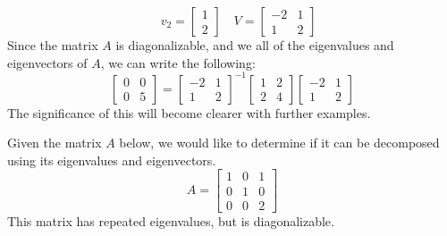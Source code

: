 \begin{example}
\begin{equation*}
  \quad
  v_{2}=
  \left[
    \begin{array}{c}
      1 \\ 2
    \end{array}
  \right]
  \quad
  V=
  \left[
    \begin{array}{cc}
      -2 & 1 \\ 1 & 2
    \end{array}
  \right]
\end{equation*}
Since the matrix $A$ is diagonalizable, and we all of the eigenvalues and eigenvectors of $A$, we can write the following:
\begin{equation*}
  \left[
    \begin{array}{cc}
    0 & 0 \\ 0 & 5
    \end{array}
  \right]
  =
  \left[
    \begin{array}{cc}
    -2 & 1 \\ 1 & 2
    \end{array}
  \right]^{-1}
  \left[
    \begin{array}{cc}
    1 & 2 \\ 2 & 4
    \end{array}
  \right]
  \left[
    \begin{array}{cc}
    -2 & 1 \\ 1 & 2
    \end{array}
  \right]
\end{equation*}
The significance of this will become clearer with further examples.
\end{example}

\begin{example}
  Given the matrix $A$ below, we would like to determine if it can be decomposed using its eigenvalues and eigenvectors.
  \begin{equation*}
    A=
    \left[
      \begin{array}{ccc}
        1 & 0 & 1 \\ 0 & 1 & 0 \\ 0 & 0 & 2
      \end{array}
    \right]
  \end{equation*}
  This matrix has repeated eigenvalues, but is diagonalizable.
\end{example}

